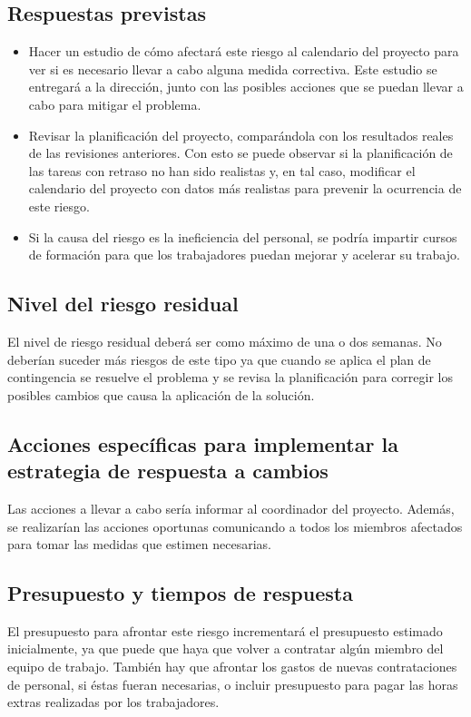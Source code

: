 \documentclass[11pt,a4paper,spanish,twoside]{book}
\begin{document}
\subsection{Respuestas previstas}
\begin{itemize}
\item Hacer un estudio de cómo afectará este riesgo
  al calendario del proyecto para ver si es necesario llevar a cabo alguna
  medida correctiva. Este estudio se entregará a la dirección, junto con las
  posibles acciones que se puedan llevar a cabo para mitigar el problema. 
\item Revisar la planificación del proyecto, comparándola con los resultados
  reales de las revisiones anteriores. Con esto se puede observar si la
  planificación de las tareas con retraso no han sido realistas y, en tal caso,
  modificar el calendario del proyecto con datos más realistas para prevenir
  la ocurrencia de este riesgo.
\item Si la causa del riesgo es la ineficiencia del personal, se podría
  impartir cursos de formación para que los trabajadores puedan mejorar y
  acelerar su trabajo. 
\end{itemize}

\subsection{Nivel del riesgo residual}
El nivel de riesgo residual deberá ser como máximo de una o dos semanas. No
deberían suceder más riesgos de este tipo ya que cuando se aplica el plan de 
contingencia se resuelve el problema y se revisa la planificación para
corregir los posibles cambios que causa la aplicación de la solución. 

\subsection{Acciones específicas para implementar la estrategia de respuesta
  a cambios}
Las acciones a llevar a cabo sería informar al coordinador
del proyecto. Además, se realizarían las acciones oportunas comunicando a
todos los miembros afectados para tomar las medidas que estimen necesarias. 

\subsection{Presupuesto y tiempos de respuesta}
El presupuesto para afrontar este riesgo incrementará el presupuesto estimado
inicialmente, ya que puede que haya que volver a contratar algún miembro del
equipo de trabajo. También hay que afrontar los gastos de nuevas
contrataciones de personal, si éstas fueran necesarias, o incluir presupuesto
para pagar las horas extras realizadas por los trabajadores. 
\end{document}
